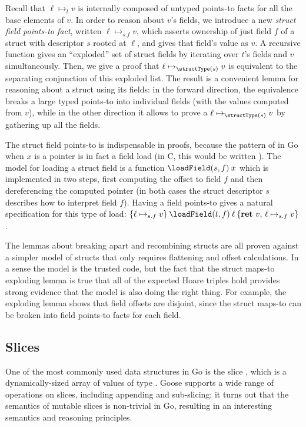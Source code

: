 Recall that $\ell \mapsto_t v$ is internally composed of untyped
points-to facts for all the base elements of $v$. In order to reason
about $v$'s fields, we introduce a new \emph{struct field points-to fact},
written $\ell \mapsto_{s.f} v$, which asserts ownership of just field
$f$ of a struct with descriptor $s$ rooted at $\ell$, and gives that field's
value as $v$. A recursive function gives an ``exploded'' set of struct
fields by iterating over $t$'s fields and $v$ simultaneously. Then,
we give a proof that $\ell \mapsto_{\structType(s)} v$ is equivalent to the separating
conjunction of this exploded list. The result is a convenient lemma for
reasoning about a struct using its fields: in the forward direction, the
equivalence breaks a large typed points-to into individual fields (with
the values computed from $v$), while in the other direction it allows
to prove a $\ell \mapsto_{\structType(s)} v$ by gathering up all the fields.

The struct field points-to is indispensable in proofs, because the
pattern of  in Go when $x$ is a pointer is in fact a field
load (in C, this would be written ). The model
for loading a struct field is a function $\loadField(s, f) \app x$
which is implemented in two steps, first computing the offset to field
$f$ and then dereferencing the computed pointer (in both cases the struct descriptor $s$
describes how to interpret field $f$). Having a field points-to gives
a natural specification for this type of load:
$\hoare{\ell \mapsto_{s.f} v}{\loadField(t, f) \app \ell}{\Ret{v} \ell \mapsto_{s.f} v}$.

The lemmas about breaking apart and recombining structs are all proven
against a simpler model of structs that only requires flattening and
offset calculations. In a sense the model is the trusted code, but the
fact that the struct maps-to exploding lemma is true that all of the
expected Hoare triples hold provides strong evidence that the model is
also doing the right thing. For example, the exploding lemma shows that
field offsets are disjoint, since the struct maps-to can be broken into
field points-to facts for each field.

\subsection{Slices}%
\label{sec:goose:slices}

One of the most commonly used data structures in Go is the slice
, which is a dynamically-sized array of values of type
. Goose supports a wide range of operations on slices,
including appending and sub-slicing; it turns out that the semantics of
mutable slices is non-trivial in Go, resulting in an interesting
semantics and reasoning principles.

